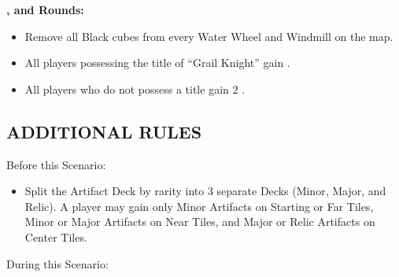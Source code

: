 \begin{multicols*}{2}
\textbf{,  and  Rounds:}
\begin{itemize}
  \item Remove all Black cubes from every Water Wheel and Windmill on the map.
  \item All players possessing the title of ``\textcolor{cobalt}{Grail Knight}'' gain .
  \item All players who do not possess a title gain 2 .
\end{itemize}

\subsection*{\MakeUppercase{Additional Rules}}
Before this Scenario:

\begin{itemize}
  \item Split the Artifact Deck by rarity into 3 separate Decks (Minor, Major, and Relic). A player may gain only Minor Artifacts on Starting or Far Tiles, Minor or Major Artifacts on Near Tiles, and Major or Relic Artifacts on Center Tiles.
\end{itemize}

During this Scenario:


\end{multicols*}
